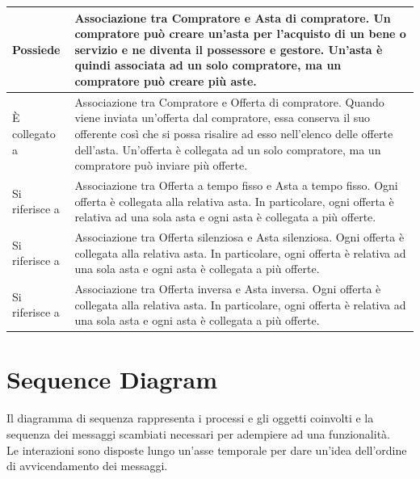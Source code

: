 \begin{longtable}{|C{3.5cm}|L{11.2cm}|}
            \hline
                Possiede &
                Associazione tra Compratore e Asta di compratore. Un compratore può creare un'asta per l'acquisto di un bene o servizio e ne diventa il possessore e gestore. Un'asta è quindi associata ad un solo compratore, ma un compratore può creare più aste.\\
            \hline
                È collegato a &
                Associazione tra Compratore e Offerta di compratore. Quando viene inviata un'offerta dal compratore, essa conserva il suo offerente così che si possa risalire ad esso nell'elenco delle offerte dell'asta. Un'offerta è collegata ad un solo compratore, ma un compratore può inviare più offerte.\\
            \hline
                Si riferisce a &
                Associazione tra Offerta a tempo fisso e Asta a tempo fisso. Ogni offerta è collegata alla relativa asta. In particolare, ogni offerta è relativa ad una sola asta e ogni asta è collegata a più offerte.\\
            \hline
                Si riferisce a &
                Associazione tra Offerta silenziosa e Asta silenziosa. Ogni offerta è collegata alla relativa asta. In particolare, ogni offerta è relativa ad una sola asta e ogni asta è collegata a più offerte.\\
            \hline
                Si riferisce a &
                Associazione tra Offerta inversa e Asta inversa. Ogni offerta è collegata alla relativa asta. In particolare, ogni offerta è relativa ad una sola asta e ogni asta è collegata a più offerte.\\
            \hline
        \end{longtable}

    \clearpage
    
    \section{Sequence Diagram}
        Il diagramma di sequenza rappresenta i processi e gli oggetti coinvolti e la sequenza dei messaggi scambiati necessari per adempiere ad una funzionalità. \\
        Le interazioni sono disposte lungo un'asse temporale per dare un'idea dell'ordine di avvicendamento dei messaggi.
        
